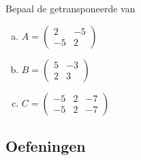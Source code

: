 \documentclass[12pt,twoside]{article}
\begin{document}
\begin{oefening}
  Bepaal de getransponeerde van
  \begin{multicols}{3}
    \begin{enumerate}[(a)]
    \item $A=
      \begin{pmatrix}
        2 & -5\\
        -5 & 2
      \end{pmatrix}
      $
    \item $B=
      \begin{pmatrix}
        5 & -3\\
        2 & 3
      \end{pmatrix}
      $
    \item $C=
      \begin{pmatrix}
        -5 & 2 & -7\\
        -5 & 2 & -7
      \end{pmatrix}
      $
    \end{enumerate}
  \end{multicols}
\end{oefening}

\needspace{3cm}
\subsection{Oefeningen}
\end{document}
